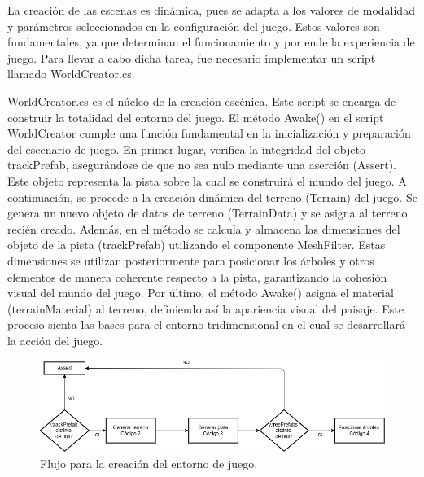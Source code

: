 La creación de las escenas es dinámica, pues se adapta a los valores de modalidad y parámetros seleccionados en la configuración del juego. Estos valores son fundamentales, ya que determinan el funcionamiento y por ende la experiencia de juego. Para llevar a cabo dicha tarea, fue necesario implementar un script llamado WorldCreator.cs.

WorldCreator.cs es el núcleo de la creación escénica. Este script se encarga de construir la totalidad del entorno del juego. El método Awake() en el script WorldCreator cumple una función fundamental en la inicialización y preparación del escenario de juego. En primer lugar, verifica la integridad del objeto trackPrefab, asegurándose de que no sea nulo mediante una aserción (Assert). Este objeto representa la pista sobre la cual se construirá el mundo del juego. A continuación, se procede a la creación dinámica del terreno (Terrain) del juego. Se genera un nuevo objeto de datos de terreno (TerrainData) y se asigna al terreno recién creado. Además, en el método se calcula y almacena las dimensiones del objeto de la pista (trackPrefab) utilizando el componente MeshFilter. Estas dimensiones se utilizan posteriormente para posicionar los árboles y otros elementos de manera coherente respecto a la pista, garantizando la cohesión visual del mundo del juego. Por último, el método Awake() asigna el material (terrainMaterial) al terreno, definiendo así la apariencia visual del paisaje. Este proceso sienta las bases para el entorno tridimensional en el cual se desarrollará la acción del juego.

\begin{figure}[ht]
    \centering
    \includegraphics[scale=0.5]{images/generate-world.png}
    \caption{Flujo para la creación del entorno de juego.}
    \label{fig: generate-world}
\end{figure}

